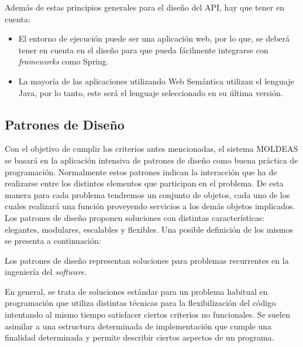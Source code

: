 Además de estas principios generales para el diseño del API, hay que tener en
cuenta: 

\begin{itemize}
  \item El entorno de ejecución puede ser una aplicación web, por lo que, se
  deberá tener en cuenta en el diseño para que pueda fácilmente integrarse con
  \textit{frameworks} como Spring.
  \item La mayoría de las aplicaciones utilizando Web Semántica utilizan el
  lenguaje Java, por lo tanto, este será el lenguaje seleccionado en su última versión.
\end{itemize}
 
\subsection{Patrones de Diseño}\label{patrones}
Con el objetivo de cumplir los criterios antes mencionadas, el sistema \gls{MOLDEAS} se basará en la aplicación 
intensiva de patrones de diseño\cite{Gamma,CoreJ2EEPatterns} como buena práctica 
de programación. Normalmente estos patrones indican la interacción que ha de realizarse entre los distintos elementos 
que participan en el problema. De esta manera para cada problema tendremos un 
conjunto de objetos, cada uno de los cuales realizará una función proveyendo servicios a 
los demás objetos implicados. Los patrones de diseño proponen soluciones con distintas características: 
elegantes, modulares, escalables y flexibles. Una posible definición de los mismos 
se presenta a continuación:

\begin{Frame}
Los patrones de diseño representan soluciones para problemas recurrentes en la ingeniería del \textit{software}.
\end{Frame}

En general, se trata de soluciones estándar para un problema habitual en programación que utiliza 
distintas técnicas para la flexibilización del código intentando al mismo tiempo satisfacer 
ciertos criterios no funcionales. Se suelen asimilar a una estructura determinada de implementación 
que cumple una finalidad determinada y permite describir ciertos aspectos de un programa.


